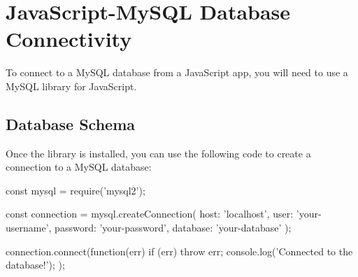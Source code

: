 \chapter{JavaScript-MySQL Database Connectivity}
To connect to a MySQL database from a JavaScript app, you will need to use a MySQL library for JavaScript.\\

\section{Database Schema}
Once the library is installed, you can use the following code to create a connection to a MySQL database:

const mysql = require('mysql2');

const connection = mysql.createConnection({
  host: 'localhost',
  user: 'your-username',
  password: 'your-password',
  database: 'your-database'
});

connection.connect(function(err) {
  if (err) throw err;
  console.log('Connected to the database!');
});
\\



